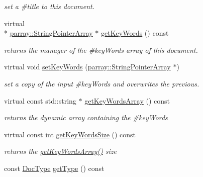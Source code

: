 \begin{DoxyCompactItemize}
\begin{DoxyCompactList}\small\item\em set a \#title to this document. \end{DoxyCompactList}\item 
\hypertarget{classdocs_1_1Document_a500da2818240e2b29c1e4510b8724f4f}{virtual \\*
\hyperlink{classparray_1_1StringPointerArray}{parray\-::\-String\-Pointer\-Array} $\ast$ \hyperlink{classdocs_1_1Document_a500da2818240e2b29c1e4510b8724f4f}{get\-Key\-Words} () const }\label{classdocs_1_1Document_a500da2818240e2b29c1e4510b8724f4f}

\begin{DoxyCompactList}\small\item\em returns the manager of the \#key\-Words array of this document. \end{DoxyCompactList}\item 
\hypertarget{classdocs_1_1Document_a99cde56ac7b8b230184b938cf55ce17e}{virtual void \hyperlink{classdocs_1_1Document_a99cde56ac7b8b230184b938cf55ce17e}{set\-Key\-Words} (\hyperlink{classparray_1_1StringPointerArray}{parray\-::\-String\-Pointer\-Array} $\ast$)}\label{classdocs_1_1Document_a99cde56ac7b8b230184b938cf55ce17e}

\begin{DoxyCompactList}\small\item\em set a copy of the input \#key\-Words and overwrites the previous. \end{DoxyCompactList}\item 
\hypertarget{classdocs_1_1Document_a9b7139734ec394970161695e2e06c263}{virtual const std\-::string $\ast$ \hyperlink{classdocs_1_1Document_a9b7139734ec394970161695e2e06c263}{get\-Key\-Words\-Array} () const }\label{classdocs_1_1Document_a9b7139734ec394970161695e2e06c263}

\begin{DoxyCompactList}\small\item\em returns the dynamic array containing the \#key\-Words \end{DoxyCompactList}\item 
\hypertarget{classdocs_1_1Document_a0af7d404eb347f27bc4e42b085aaa038}{virtual const int \hyperlink{classdocs_1_1Document_a0af7d404eb347f27bc4e42b085aaa038}{get\-Key\-Words\-Size} () const }\label{classdocs_1_1Document_a0af7d404eb347f27bc4e42b085aaa038}

\begin{DoxyCompactList}\small\item\em returns the \hyperlink{classdocs_1_1Document_a9b7139734ec394970161695e2e06c263}{get\-Key\-Words\-Array()} size \end{DoxyCompactList}\item 
\hypertarget{classdocs_1_1Document_a5626bdb2863afb9c3dd363fc5cc1bbde}{const \hyperlink{classdocs_1_1DocType}{Doc\-Type} \hyperlink{classdocs_1_1Document_a5626bdb2863afb9c3dd363fc5cc1bbde}{get\-Type} () const }\label{classdocs_1_1Document_a5626bdb2863afb9c3dd363fc5cc1bbde}


\end{DoxyCompactItemize}
